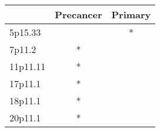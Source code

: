 \begin{tabular}{lcc}
\toprule
{} & Precancer & Primary \\
\midrule
5p15.33  &           &       * \\
7p11.2   &         * &         \\
11p11.11 &         * &         \\
17p11.1  &         * &         \\
18p11.1  &         * &         \\
20p11.1  &         * &         \\
\bottomrule
\end{tabular}
